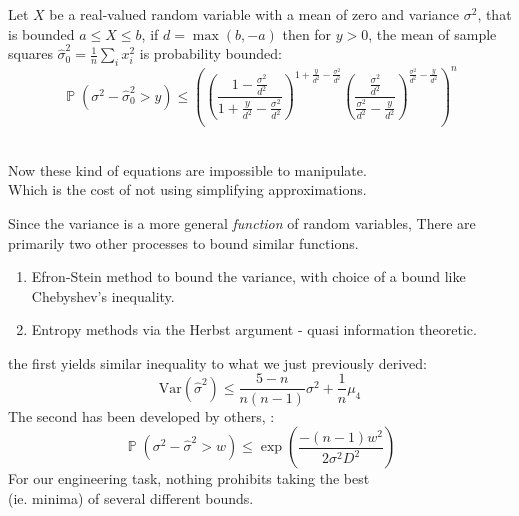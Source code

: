 \documentclass{beamer}
\DeclareMathOperator{\p}{\mathbb{P}}
\begin{document}
\begin{frame}
\begin{lemma}\label{sample_squares}
Let $X$ be a real-valued random variable with a mean of zero and variance $\sigma^2$, that is bounded $a\le X\le b$, if $d=\max(b,-a)$ then for $y>0$, the mean of sample squares $\hat{\sigma}_0^2=\frac{1}{n}\sum_ix_i^2$ is probability bounded:
\begin{equation*}\p(\sigma^2 - \hat{\sigma}_0^2> y) \le \left(
\left(\frac{1-\frac{\sigma^2}{d^2}}{1+\frac{y}{d^2}-\frac{\sigma^2}{d^2}}\right)^{1+\frac{y}{d^2}-\frac{\sigma^2}{d^2}}
\left(\frac{\frac{\sigma^2}{d^2}}{\frac{\sigma^2}{d^2}-\frac{y}{d^2}}\right)^{\frac{\sigma^2}{d^2}-\frac{y}{d^2}}
\right)^n
\end{equation*}
\end{lemma}
\-\hspace{1cm}\\
Now these kind of equations are impossible to manipulate.\\
Which is the cost of not using simplifying approximations.
\end{frame}


\begin{frame}
Since the variance is a more general \textit{function} of random variables, There are primarily two other processes to bound similar functions.
\begin{enumerate}
\item Efron-Stein method to bound the variance, with choice of a bound like Chebyshev's inequality.
\item Entropy methods via the Herbst argument - quasi information theoretic.
\end{enumerate}
the first yields similar inequality to what we just previously derived:
$$ \text{Var}(\hat{\sigma}^2) \le \frac{5-n}{n(n-1)}\sigma^2 + \frac{1}{n}\mu_4 $$
The second has been developed by others, \cite{MR2245497}:
$$ \p(\sigma^2 - \hat{\sigma}^2>w) \le \exp\left(\frac{-(n-1)w^2}{2\sigma^2D^2}\right) $$
For our engineering task, nothing prohibits taking the best\\(ie. minima) of several different bounds. 
\end{frame}
\end{document}
